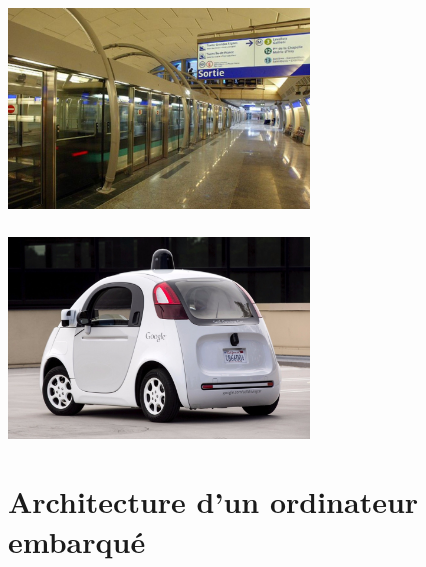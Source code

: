 \documentclass[svgnames,11pt]{beamer}
\begin{document}
\begin{frame}
    \frametitle{}

    \begin{center}
        \centering
        \includegraphics[width=8cm]{ressources/metro.jpg}
        \label{IMG}
    \end{center}

\end{frame}
\begin{frame}
    \frametitle{}

    \begin{center}
        \centering
        \includegraphics[width=8cm]{ressources/voiture.jpg}
        \label{IMG}
    \end{center}

\end{frame}
\begin{frame}
    \frametitle{}
    \begin{center}
    \end{center}


\end{frame}

\section{Architecture d'un ordinateur embarqué}
\end{document}
